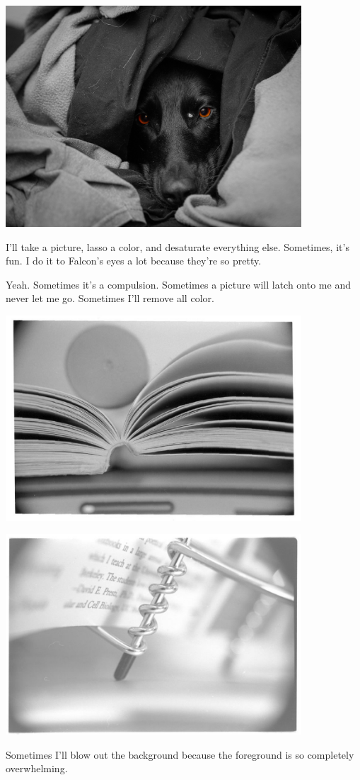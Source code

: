 \begin{paracol}{2}
\begin{leftcolumn}

\noindent\includegraphics[width=4.35in]{../static/color/orange_eyes.jpg}

I'll take a picture, lasso a color, and desaturate everything else. Sometimes, it's fun. I do it to Falcon's eyes a lot because they're so pretty.


Yeah. Sometimes it's a compulsion. Sometimes a picture will latch onto me and never let me go. Sometimes I'll remove all color.


\noindent\includegraphics[width=4.35in]{../static/color/bw1.jpg}

\noindent\includegraphics[width=4.35in]{../static/color/bw2.jpg}

\newpage

Sometimes I'll blow out the background because the foreground is so completely overwhelming.
\end{leftcolumn}
\end{paracol}
\vfill

